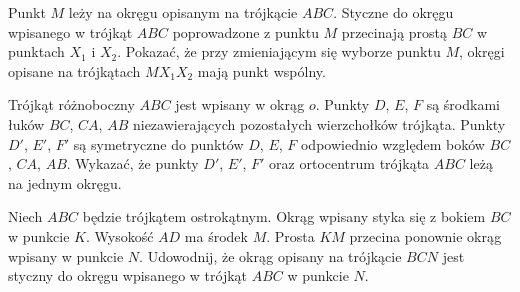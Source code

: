 \documentclass{lecture-kuznia}
\begin{document}
\begin{problem}
Punkt $M$ leży na okręgu opisanym na trójkącie $ABC$. Styczne do okręgu wpisanego w trójkąt $ABC$ poprowadzone z punktu $M$ przecinają prostą $BC$ w punktach $X_1$ i $X_2$. Pokazać, że przy zmieniającym się wyborze punktu $M$, okręgi opisane na trójkątach $MX_1X_2$ mają punkt wspólny.
\end{problem}

\begin{problem}
Trójkąt różnoboczny $ABC$ jest wpisany w okrąg $o$. Punkty $D$, $E$, $F$ są środkami łuków $BC$, $CA$, $AB$ niezawierających pozostałych wierzchołków trójkąta. Punkty $D'$, $E'$, $F'$ są symetryczne do punktów $D$, $E$, $F$ odpowiednio względem boków $BC$, $CA$, $AB$. Wykazać, że punkty $D'$, $E'$, $F'$ oraz ortocentrum trójkąta $ABC$ leżą na jednym okręgu.
\end{problem}

\begin{problem}
Niech $ABC$ będzie trójkątem ostrokątnym. Okrąg wpisany styka się z bokiem $BC$ w punkcie $K$. Wysokość $AD$ ma środek $M$. Prosta $KM$ przecina ponownie okrąg wpisany w punkcie $N$. Udowodnij, że okrąg opisany na trójkącie $BCN$ jest styczny do okręgu wpisanego w trójkąt $ABC$ w punkcie $N$.
\end{problem}
\end{document}
